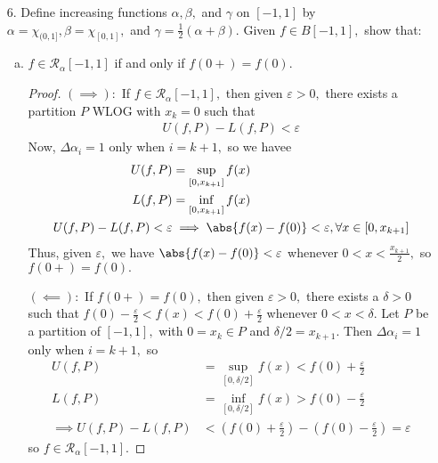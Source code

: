 \documentclass{article}
\begin{document}
\begin{itemize}
	\item[6.] Define increasing functions $\alpha, \beta,$ and $\gamma$ on $[-1, 1]$ by $\alpha=\chi_{(0, 1]}, \beta=\chi_{[0, 1]},$ and $\gamma=\frac{1}{2}(\alpha+\beta).$ Given $f\in B[-1, 1],$ show that:
		\begin{enumerate}[(a)]
			\item $f\in\mathcal R_\alpha[-1, 1]$ if and only if $f(0+)=f(0).$
				\begin{proof}
					$(\implies):$ If $f\in\mathcal R_\alpha[-1, 1],$ then given $\varepsilon>0,$ there exists a partition $P$ WLOG with $x_k=0$ such that
					\begin{align*}
						U(f, P)-L(f, P)<\varepsilon
					\end{align*}
					Now, $\Delta\alpha_i=1$ only when $i=k+1,$ so we havee
					\begin{align*}
						U(f, P) &= \sup_{[0, x_{k+1}]} f(x) \\
						L(f, P) &= \inf_{[0, x_{k+1}]} f(x) \\
						U(f, P)-L(f, P) <\varepsilon &\implies \abs{f(x)-f(0)}<\varepsilon, \forall x\in [0, x_{k+1}]
					\end{align*}
					Thus, given $\varepsilon,$ we have $\abs{f(x)-f(0)}<\varepsilon$ whenever $0<x<\frac{x_{k+1}}{2},$ so $f(0+)=f(0).$

					$(\impliedby):$ If $f(0+)=f(0),$ then given $\varepsilon>0,$ there exists a $\delta>0$ such that $f(0)-\frac{\varepsilon}{2}<f(x)<f(0)+\frac{\varepsilon}{2}$ whenever $0<x<\delta.$ Let $P$ be a partition of $[-1, 1],$ with $0=x_k\in P$ and $\delta/2=x_{k+1}.$ Then $\Delta\alpha_i=1$ only when $i=k+1,$ so
					\begin{align*}
						U(f, P) &= \sup_{[0, \delta/2]} f(x) < f(0)+\frac{\varepsilon}{2} \\
						L(f, P) &= \inf_{[0, \delta/2]} f(x) > f(0) - \frac{\varepsilon}{2} \\
						\implies U(f, P) - L(f, P) &< \left( f(0)+\frac{\varepsilon}{2} \right) - \left( f(0)-\frac{\varepsilon}{2} \right) = \varepsilon
					\end{align*}
					so $f\in\mathcal R_\alpha[-1, 1].$
				\end{proof}


\end{enumerate}
\end{itemize}
\end{document}
